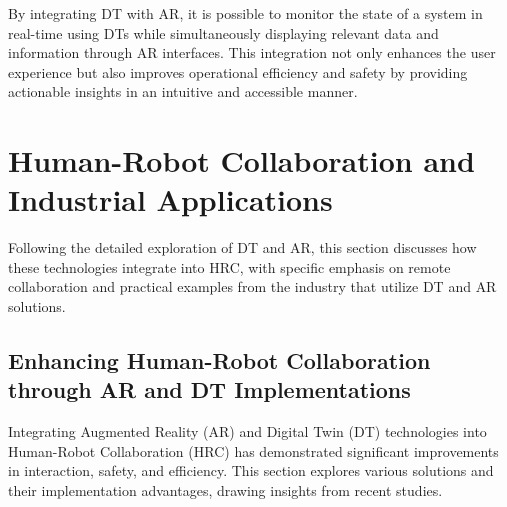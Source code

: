 By integrating \ac{DT} with \ac{AR}, it is possible to monitor the state of a system in real-time using \ac{DT}s while simultaneously displaying relevant
data and information through \ac{AR} interfaces. This integration not only enhances the user experience but also improves operational efficiency and 
safety by providing actionable insights in an intuitive and accessible manner.

\section{Human-Robot Collaboration and Industrial Applications}
Following the detailed exploration of \ac{DT} and \ac{AR}, this section discusses how these technologies integrate into \ac{HRC}, with specific emphasis 
on remote collaboration and practical examples from the industry that utilize \ac{DT} and \ac{AR} solutions.

\subsection{Enhancing Human-Robot Collaboration through AR and DT Implementations}

Integrating Augmented Reality (AR) and Digital Twin (DT) technologies into Human-Robot Collaboration (HRC) has demonstrated significant improvements in 
interaction, safety, and efficiency. This section explores various solutions and their implementation advantages, drawing insights from recent studies.

